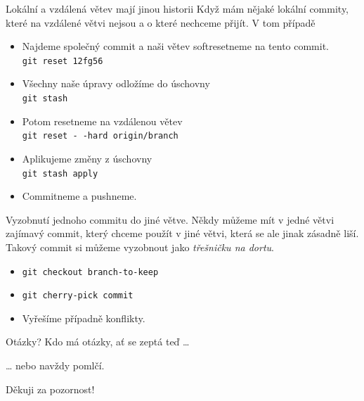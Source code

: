 \documentclass[14pt]{beamer}
\renewcommand{\texttt}[1]{{{\tt\color{blue}#1}}}
\begin{document}
\begin{frame}{Lokální a vzdálená větev mají jinou historii}
Když mám nějaké lokální commity, které na vzdálené větvi nejsou a o které nechceme přijít. V tom případě
	\begin{itemize}
		\item Najdeme společný commit a naši větev softresetneme na tento commit. \\ \texttt{git reset 12fg56}
		\item Všechny naše úpravy odložíme do úschovny \\
		\texttt{git stash}
		\item Potom resetneme na vzdálenou větev\\
		\texttt{git reset -\,-hard origin/branch}
		\item Aplikujeme změny z úschovny\\
		\texttt{git stash apply}
		\item Commitneme a pushneme.
	\end{itemize}
\end{frame}

\begin{frame}{Vyzobnutí jednoho commitu do jiné větve.}
	Někdy můžeme mít v jedné větvi zajímavý commit, který chceme použít v jiné větvi, která se ale jinak zásadně liší. Takový commit si můžeme vyzobnout jako \textit{třešničku na dortu}.
	\begin{itemize}
		\item \texttt{git checkout branch-to-keep}
		\item \texttt{git cherry-pick commit}
		\item Vyřešíme případně konflikty.
	\end{itemize}
\end{frame}

\begin{frame}{Otázky?}
	Kdo má otázky, ať se zeptá teď \ldots{}
	
	\vspace{15pt}
	
	\ldots{} nebo navždy pomlčí.
\end{frame}

\begin{frame}{}
	Děkuji za pozornost!
\end{frame}
\end{document}
